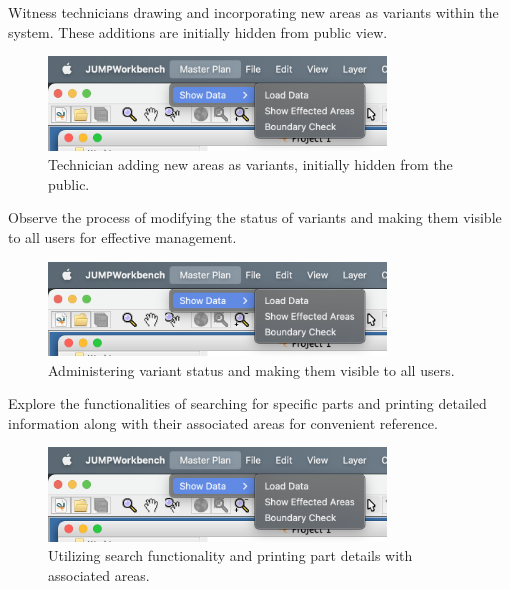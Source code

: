 Witness technicians drawing and incorporating new areas as variants within the system. These additions are initially hidden from public view.
\begin{figure}[H]
    \centering
    \includegraphics[width=0.8\textwidth]{res/plugin/01-menu}
    \caption{Technician adding new areas as variants, initially hidden from the public.}
    \label{fig:web-create-var}
\end{figure}

Observe the process of modifying the status of variants and making them visible to all users for effective management.
\begin{figure}[H]
    \centering
    \includegraphics[width=0.8\textwidth]{res/plugin/01-menu}
    \caption{Administering variant status and making them visible to all users.}
    \label{fig:web-edit-var}
\end{figure}

Explore the functionalities of searching for specific parts and printing detailed information along with their associated areas for convenient reference.
\begin{figure}[H]
    \centering
    \includegraphics[width=0.8\textwidth]{res/plugin/01-menu}
    \caption{Utilizing search functionality and printing part details with associated areas.}
    \label{fig:web-search}
\end{figure}


